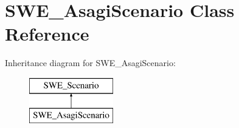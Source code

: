 \hypertarget{classSWE__AsagiScenario}{\section{S\-W\-E\-\_\-\-Asagi\-Scenario Class Reference}
\label{classSWE__AsagiScenario}
}
Inheritance diagram for S\-W\-E\-\_\-\-Asagi\-Scenario\-:\begin{figure}[H]
\begin{center}
\leavevmode
\includegraphics[height=2.000000cm]{classSWE__AsagiScenario}
\end{center}
\end{figure}
